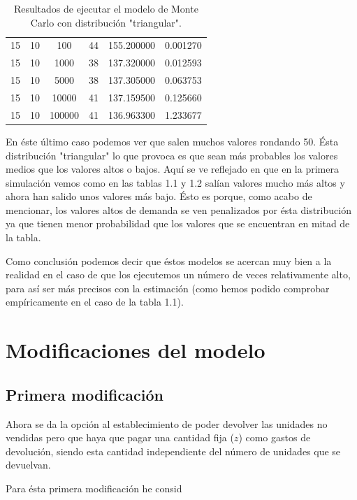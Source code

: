 \documentclass[11pt,a4paper]{report}
\begin{document}
\begin{table}[H]
{\begin{tabular}{|c|c|c|c|c|c|}
        15 & 10 & 100 & 44 & 155.200000 & 0.001270 \\ 
        15 & 10 & 1000 & 38 & 137.320000 & 0.012593 \\ 
        15 & 10 & 5000 & 38 & 137.305000 & 0.063753 \\ 
        15 & 10 & 10000 & 41 & 137.159500 & 0.125660 \\ 
        15 & 10 & 100000 & 41 & 136.963300 & 1.233677 \\ \hline
\end{tabular}
}%
\caption{Resultados de ejecutar el modelo de Monte Carlo con distribución "triangular".}
\label{tabla3}
\end{table}

En éste último caso podemos ver que salen muchos valores rondando 50. Ésta distribución "triangular" lo que provoca es que sean más probables los valores medios que los valores altos o bajos. Aquí se ve reflejado en que en la primera simulación vemos como en las tablas 1.1 y 1.2 salían valores mucho más altos y ahora han salido unos valores más bajo. Ésto es porque, como acabo de mencionar, los valores altos de demanda se ven penalizados por ésta distribución ya que tienen menor probabilidad que los valores que se encuentran en mitad de la tabla.

Como conclusión podemos decir que éstos modelos se acercan muy bien a la realidad en el caso de que los ejecutemos un número de veces relativamente alto, para así ser más precisos con la estimación (como hemos podido comprobar empíricamente en el caso de la tabla 1.1).

\newpage

\section{Modificaciones del modelo}
\subsection{Primera modificación}

Ahora se da la opción al establecimiento de poder devolver las unidades no vendidas pero que haya que pagar una cantidad fija ($z$) como gastos de devolución, siendo esta cantidad independiente del número de unidades que se devuelvan.

Para ésta primera modificación he consid
\end{document}
